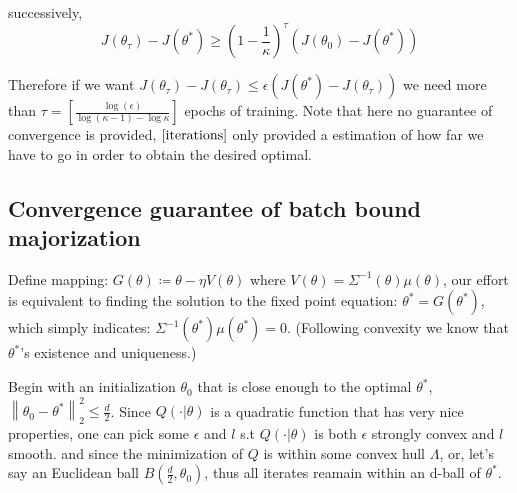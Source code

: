 \documentclass{article}
\begin{document}
 successively,
\begin{equation}
  J(\theta_{\tau}) - J(\theta^*) \geq (1-\frac{1}{\kappa})^{\tau}(J(\theta_{0}) - J(\theta^*))  
  \label{iterations}
\end{equation}

Therefore if we want $J(\theta_{\tau}) - J(\theta_{\tau}) \leq \epsilon(J(\theta^*) - J(\theta_{\tau}))$ we need more than $\tau = [\frac{\log(\epsilon)}{\log(\kappa-1) - \log \kappa}]$ epochs
of training. Note that here no guarantee of convergence is provided, $\ref{iterations}$ only provided a estimation of how far we have to go in order to obtain the desired optimal.




\subsection{Convergence guarantee of batch bound majorization}

Define mapping: $G(\theta) \coloneqq \theta - \eta V(\theta )$
where $V(\theta) = \Sigma^{-1}(\theta) \mu(\theta)$, our effort is equivalent to finding the solution to the fixed point equation: $\theta^* = G(\theta^*)$,
which simply indicates: $\Sigma^{-1}(\theta^*) \mu(\theta^*) = 0$. (Following convexity we know that $\theta^*$'s existence and uniqueness.)

Begin with an initialization $\theta_0$ that is close enough to the optimal $\theta^*$, $\left\lVert\theta_0 - \theta^*\right\lVert_2^2 \leq \frac{d}{2}$.
Since $Q(\cdot| \theta)$ is a quadratic function that has very nice properties, one can pick some $\epsilon$ and $l$ s.t $Q(\cdot| \theta)$ is both $\epsilon$ strongly convex and $l$ smooth.
and since the minimization of $Q$ is within some convex hull $\Lambda$, or, let's say an Euclidean ball $B(\frac{d}{2}, \theta_0)$, thus all iterates reamain within
an d-ball of $\theta^*$.
\end{document}
